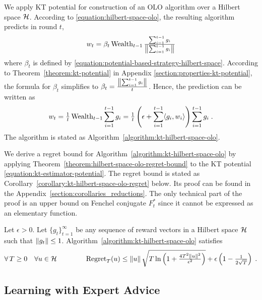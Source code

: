We apply KT potential for construction of an OLO algorithm over a Hilbert
space $\mathcal{H}$. According to \eqref{equation:hilbert-space-olo}, the resulting algorithm predicts
in round $t$,
$$
w_t = \beta_t \operatorname{Wealth}_{t-1} \tfrac{\sum_{i=1}^{t-1} g_i}{\left\|{\sum_{i=1}^{t-1} g_i}\right\|}
$$
where $\beta_t$ is defined by
\eqref{equation:potential-based-strategy-hilbert-space}. According to
Theorem~\ref{theorem:kt-potential} in Appendix
\ref{section:properties-kt-potential}, the formula for $\beta_t$ simplifies to
$\beta_t = \frac{\left\|{\sum_{i=1}^{t-1} g_i}\right\|}{t}$. Hence, the prediction can be
written as
$$
w_t
= \tfrac{1}{t} \operatorname{Wealth}_{t-1} \sum_{i=1}^{t-1} g_i
= \tfrac{1}{t} \left(\epsilon + \sum_{i=1}^{t-1} \langle g_i, w_i \rangle \right) \sum_{i=1}^{t-1} g_i \; .
$$
The algorithm is stated as Algorithm~\ref{algorithm:kt-hilbert-space-olo}.

We derive a regret bound for Algorithm~\ref{algorithm:kt-hilbert-space-olo} by
applying Theorem~\ref{theorem:hilbert-space-olo-regret-bound} to the KT
potential \eqref{equation:kt-estimator-potential}. The regret bound is stated as
Corollary~\ref{corollary:kt-hilbert-space-olo-regret} below. Its proof can be
found in the Appendix~\ref{section:corollaries_reductions}. The only technical
part of the proof is an upper bound on Fenchel conjugate $F_t^*$ since it cannot
be expressed as an elementary function.

\begin{corollary}
\label{corollary:kt-hilbert-space-olo-regret}
Let $\epsilon > 0$. Let $\{g_t\}_{t=1}^\infty$ be any sequence of reward vectors
in a Hilbert space $\mathcal{H}$ such that $\left\|{g_t}\right\| \le 1$.
Algorithm~\ref{algorithm:kt-hilbert-space-olo} satisfies
$$
\forall \, T \ge 0 \quad
\forall u \in \mathcal{H} \qquad \qquad
\operatorname{Regret}_T(u) \le \left\|{u}\right\| \sqrt{T \ln\left(1 + \tfrac{4T^2 \left\|{u}\right\|^2}{\epsilon^2} \right)} + \epsilon \left(1 - \tfrac{1}{2\sqrt{T}} \right) \;.
$$
\end{corollary}

\subsection{Learning with Expert Advice}
\label{sec:kt-lea}

